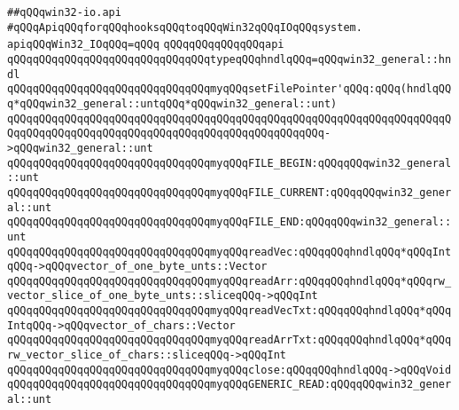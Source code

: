 \label{src/lib/std/src/win32/win32-io.api}
\verb|##qQQqwin32-io.api|\newline
\newline
\newline
\newline
\newline
\verb|#qQQqApiqQQqforqQQqhooksqQQqtoqQQqWin32qQQqIOqQQqsystem.|\newline
\newline
\newline
\verb|apiqQQqWin32_IOqQQq=qQQq|\newline
\verb|qQQqqQQqqQQqqQQqapi|\newline
\verb|qQQqqQQqqQQqqQQqqQQqqQQqqQQqqQQqtypeqQQqhndlqQQq=qQQqwin32_general::hndl|\newline
\verb|qQQqqQQqqQQqqQQqqQQqqQQqqQQqqQQqmyqQQqsetFilePointer'qQQq:qQQq(hndlqQQq*qQQqwin32_general::untqQQq*qQQqwin32_general::unt)|\newline
\verb|qQQqqQQqqQQqqQQqqQQqqQQqqQQqqQQqqQQqqQQqqQQqqQQqqQQqqQQqqQQqqQQqqQQqqQQqqQQqqQQqqQQqqQQqqQQqqQQqqQQqqQQqqQQqqQQqqQQqqQQq->qQQqwin32_general::unt|\newline
\newline
\verb|qQQqqQQqqQQqqQQqqQQqqQQqqQQqqQQqmyqQQqFILE_BEGIN:qQQqqQQqwin32_general::unt|\newline
\verb|qQQqqQQqqQQqqQQqqQQqqQQqqQQqqQQqmyqQQqFILE_CURRENT:qQQqqQQqwin32_general::unt|\newline
\verb|qQQqqQQqqQQqqQQqqQQqqQQqqQQqqQQqmyqQQqFILE_END:qQQqqQQqwin32_general::unt|\newline
\newline
\verb|qQQqqQQqqQQqqQQqqQQqqQQqqQQqqQQqmyqQQqreadVec:qQQqqQQqhndlqQQq*qQQqIntqQQq->qQQqvector_of_one_byte_unts::Vector|\newline
\verb|qQQqqQQqqQQqqQQqqQQqqQQqqQQqqQQqmyqQQqreadArr:qQQqqQQqhndlqQQq*qQQqrw_vector_slice_of_one_byte_unts::sliceqQQq->qQQqInt|\newline
\verb|qQQqqQQqqQQqqQQqqQQqqQQqqQQqqQQqmyqQQqreadVecTxt:qQQqqQQqhndlqQQq*qQQqIntqQQq->qQQqvector_of_chars::Vector|\newline
\verb|qQQqqQQqqQQqqQQqqQQqqQQqqQQqqQQqmyqQQqreadArrTxt:qQQqqQQqhndlqQQq*qQQqrw_vector_slice_of_chars::sliceqQQq->qQQqInt|\newline
\newline
\verb|qQQqqQQqqQQqqQQqqQQqqQQqqQQqqQQqmyqQQqclose:qQQqqQQqhndlqQQq->qQQqVoid|\newline
\newline
\verb|qQQqqQQqqQQqqQQqqQQqqQQqqQQqqQQqmyqQQqGENERIC_READ:qQQqqQQqwin32_general::unt|\newline
